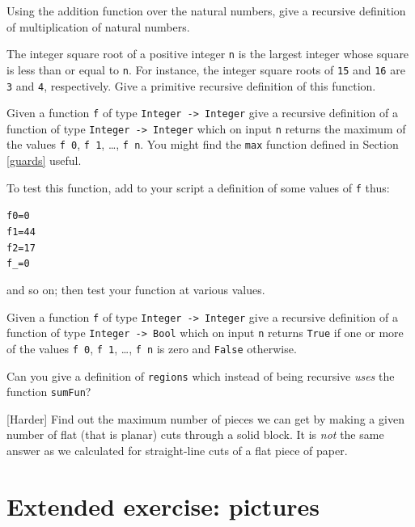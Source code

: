 \begin{exercises}

\item Using the addition function over the natural numbers, give a recursive definition 
of multiplication of natural numbers.

\item The integer square root of a positive integer \texttt{n} is the largest
integer whose square is less than or equal to \texttt{n}. For instance,
the integer square roots of \texttt{15}
and \texttt{16} are \texttt{3} and \texttt{4}, respectively. Give a
primitive recursive definition of this function.

\item Given a function \texttt{f} of type \texttt{Integer -> Integer} give a
recursive definition of a function of type \texttt{Integer -> Integer}
which on input \texttt{n} returns the 
maximum of the values \texttt{f 0}, \texttt{f 1}, \ldots, \texttt{f n}. You
might find the \texttt{max} function defined in Section \ref{guards} useful.

To test this function, add to your script a definition of some values of
\texttt{f} thus:
\begin{alltt}
f 0 = 0
f 1 = 44
f 2 = 17
f _ = 0
\end{alltt}
and so on; then test your function at various values.

\item Given a function \texttt{f} of type \texttt{Integer -> Integer} give a
recursive definition of a function of type \texttt{Integer -> Bool}
which on input \texttt{n} returns \texttt{True} if one or more of the values
\texttt{f 0}, \texttt{f 1}, \ldots, \texttt{f n} is zero and
\texttt{False} otherwise.

\item
Can you give a definition of \texttt{regions}
which instead of being recursive {\em uses\/} the function \texttt{sumFun}?

\item 
{[Harder]} Find
out the maximum number of pieces we can get
by making a given number of flat (that is planar) cuts 
through a solid block. It is {\em not\/} the same answer as we calculated
for straight-line cuts of a flat piece of paper. 
\end{exercises}


\section{Extended exercise: pictures}

